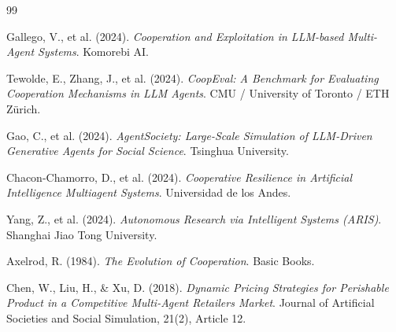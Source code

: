 \documentclass[12pt, a4paper]{article}
\begin{document}

\begin{thebibliography}{99}

Gallego, V., et al. (2024).
\textit{Cooperation and Exploitation in LLM-based Multi-Agent Systems}.
Komorebi AI.

Tewolde, E., Zhang, J., et al. (2024).
\textit{CoopEval: A Benchmark for Evaluating Cooperation Mechanisms in LLM Agents}.
CMU / University of Toronto / ETH Zürich.

Gao, C., et al. (2024).
\textit{AgentSociety: Large-Scale Simulation of LLM-Driven Generative Agents for Social Science}.
Tsinghua University.

Chacon-Chamorro, D., et al. (2024).
\textit{Cooperative Resilience in Artificial Intelligence Multiagent Systems}.
Universidad de los Andes.

Yang, Z., et al. (2024).
\textit{Autonomous Research via Intelligent Systems (ARIS)}.
Shanghai Jiao Tong University.

Axelrod, R. (1984).
\textit{The Evolution of Cooperation}.
Basic Books.

Chen, W., Liu, H., \& Xu, D. (2018).
\textit{Dynamic Pricing Strategies for Perishable Product in a Competitive Multi-Agent Retailers Market}.
Journal of Artificial Societies and Social Simulation, 21(2), Article 12.

\end{thebibliography}
\end{document}
